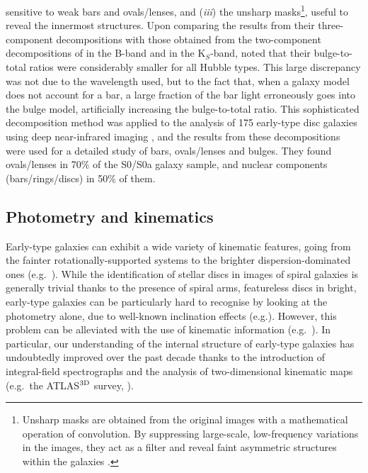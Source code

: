 sensitive to weak bars and ovals/lenses, 
and (\emph{iii}) the unsharp masks\footnote{Unsharp masks are obtained from the original images 
with a mathematical operation of convolution. By suppressing large-scale, low-frequency variations 
in the images, they act as a filter and reveal faint asymmetric structures within the galaxies 
\citep{malinzealey1979,erwinsparke2003}.}, useful to reveal the innermost structures. 
Upon comparing the results from their three-component decompositions 
with those obtained from the two-component decompositions of \cite{simiendevaucouleurs1986} in the B-band 
and \cite{desouza2004} in the K$_S$-band, 
\cite{laurikainen2005} noted that their bulge-to-total ratios were considerably smaller for all Hubble types. 
This large discrepancy was not due to the wavelength used, 
but to the fact that, when a galaxy model does not account for a bar, 
a large fraction of the bar light erroneously goes into the bulge model, 
artificially increasing the bulge-to-total ratio. 
This sophisticated decomposition method was applied to the analysis of 175 early-type disc galaxies 
using deep near-infrared imaging \citep{laurikainen2007,laurikainen2010},  
and the results from these decompositions were used for a detailed study of bars, ovals/lenses and bulges. 
They found ovals/lenses in 70\% of the S0/S0a galaxy sample, 
and nuclear components (bars/rings/discs) in 50\% of them. 



\subsection{Photometry and kinematics}
\label{sec:photokin}
Early-type galaxies can exhibit a wide variety of kinematic features, 
going from the fainter rotationally-supported systems to the brighter dispersion-dominated ones (e.g.~\citealt{davies1983}). 
While the identification of stellar discs in images of spiral galaxies is generally trivial thanks to the presence of spiral arms, 
featureless discs in bright, early-type galaxies can be particularly hard to recognise 
by looking at the photometry alone, due to well-known inclination effects (e.g.\citealt{rixwhite1990,gerhardbinney1996}). 
However, this problem can be alleviated with the use of kinematic information
(e.g.~\citealt{carter1987,franx1989,nieto1991,rixwhite1992,cinzanovandermarel1993,donofrio1995,graham1998fornax}).
In particular, our understanding of the internal structure of early-type galaxies has undoubtedly improved over the past decade 
thanks to the introduction of integral-field spectrographs and the analysis of two-dimensional kinematic maps 
(e.g.~the ATLAS$^{\rm 3D}$ survey, \citealt{cappellari2011}). \\

